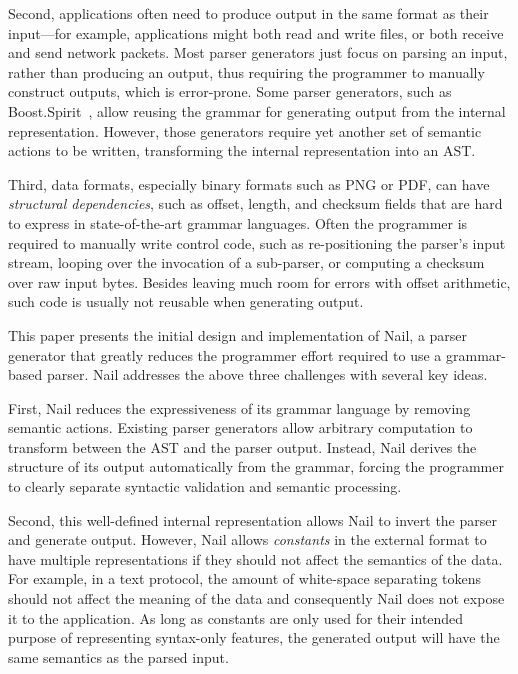 Second,  applications often need to produce output in the same
format as their input---for example, applications might both
read and write files, or both receive and send network packets.
Most parser generators just focus on parsing an input, rather
than producing an output, thus requiring the programmer to manually
construct outputs, which is error-prone.  Some parser generators, such as
Boost.Spirit~\cite{boost-spirit},
allow reusing the grammar for generating output from the internal
representation.  However, those generators require yet another set of
semantic actions to be written, transforming the internal representation
into an AST\@.


Third, data formats, especially binary formats such as PNG or PDF, can have \emph{structural dependencies}, such as offset, length, and checksum fields
that are hard to express in state-of-the-art grammar languages. Often the programmer is required to
manually write control code, such as re-positioning the parser's input stream, looping over the
invocation of a sub-parser, or computing a
checksum over raw input bytes.  Besides leaving much room for errors with offset arithmetic, such
code is usually not reusable when generating output.


This paper presents the initial design and implementation of Nail, a parser
generator that greatly reduces the programmer effort required to use a
grammar-based parser. Nail addresses the above three challenges with several key
ideas.

First, Nail reduces the expressiveness of its grammar language by removing
semantic actions. Existing parser generators allow arbitrary computation to
transform between the AST and the parser output. Instead, Nail derives the
structure of its output automatically from the grammar, forcing the programmer
to clearly separate syntactic validation and semantic processing.

Second, this well-defined internal representation allows Nail to invert the
parser and generate output. However, Nail allows \emph{constants} in the
external format to have multiple representations if they should not affect the
semantics of the data. For example, in a text protocol, the amount of
white-space separating tokens should not affect the meaning of the data and
consequently Nail does not expose it to the application. As long as
constants are only used for their intended purpose of representing syntax-only
features, the generated output will have the same semantics as the parsed input.

